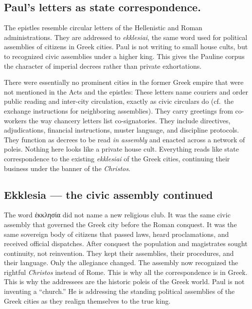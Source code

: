 \subsection{Paul’s letters as state correspondence.}\label{subsec:pauls-letters-as-state-correspondence.}

The epistles resemble circular letters of the Hellenistic and Roman administrations.
They are addressed to \textit{ekklesiai}, the same word used for political assemblies of citizens in Greek cities.
Paul is not writing to small house cults, but to recognized civic assemblies under a higher king.
This gives the Pauline corpus the character of imperial decrees rather than private exhortations.

There were essentially no prominent cities in the former Greek empire that were not mentioned in the Acts and the epistles:
These letters name couriers and order public reading and inter-city circulation, exactly as civic circulars do (cf.\ the exchange instructions for neighboring assemblies).
They carry greetings from co-workers the way chancery letters list co-signatories.
They include directives, adjudications, financial instructions, muster language, and discipline protocols.
They function as decrees to be read \emph{in assembly} and enacted across a network of poleis.
Nothing here looks like a private house cult.
Everything reads like state correspondence to the existing \textit{ekklesiai} of the Greek cities, continuing their business under the banner of the \textit{Christos}.

\subsection{Ekklesia — the civic assembly continued}\label{subsec:ekklesia-the-civic-assembly-continued}

The word ἐκκλησία did not name a new religious club.
It was the same civic assembly that governed the Greek city before the Roman conquest.
It was the same sovereign body of citizens that passed laws, heard proclamations, and received official dispatches.
After conquest the population and magistrates sought continuity, not reinvention.
They kept their assemblies, their procedures, and their language.
Only the allegiance changed.
The assembly now recognized the rightful \textit{Christos} instead of Rome.
This is why all the correspondence is in Greek.
This is why the addressees are the historic poleis of the Greek world.
Paul is not inventing a “church.”
He is addressing the standing political assemblies of the Greek cities as they realign themselves to the true king.

